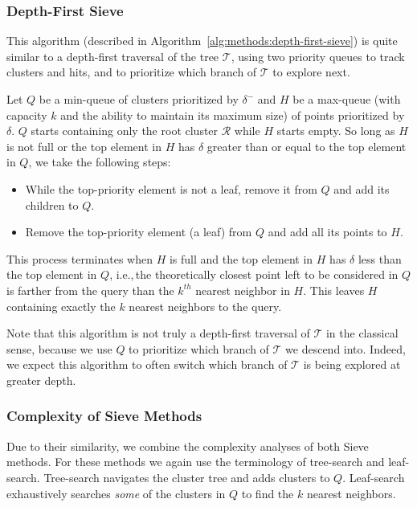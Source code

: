 \subsubsection{Depth-First Sieve}
\label{sec:methods:knn-search:depth-first-sieve}

This algorithm (described in Algorithm~\ref{alg:methods:depth-first-sieve}) is quite similar to a depth-first traversal of the tree $\mathcal{T}$, using two priority queues to track clusters and hits, and to prioritize which branch of $\mathcal{T}$ to explore next.

Let $Q$ be a min-queue of clusters prioritized by $\delta^{-}$ and $H$ be a max-queue (with capacity $k$ and the ability to maintain its maximum size) of points prioritized by $\delta$.
$Q$ starts containing only the root cluster $\mathcal{R}$ while $H$ starts empty.
So long as $H$ is not full or the top element in $H$ has $\delta$ greater than or equal to the top element in $Q$, we take the following steps:

\begin{itemize}
    \item While the top-priority element is not a leaf, remove it from $Q$ and add its children to $Q$.
    \item Remove the top-priority element (a leaf) from $Q$ and add all its points to $H$.
\end{itemize}

This process terminates when $H$ is full and the top element in $H$ has $\delta$ less than the top element in $Q$, i.e.,\,the theoretically closest point left to be considered in $Q$ is farther from the query than the $k^{th}$ nearest neighbor in $H$.
This leaves $H$ containing exactly the $k$ nearest neighbors to the query.

Note that this algorithm is not truly a depth-first traversal of $\mathcal{T}$ in the classical sense, because we use $Q$ to prioritize which branch of $\mathcal{T}$ we descend into.
Indeed, we expect this algorithm to often switch which branch of $\mathcal{T}$ is being explored at greater depth.


\subsubsection{Complexity of Sieve Methods}
\label{sec:methods:knn-search:complexity-of-sieve-methods}

Due to their similarity, we combine the complexity analyses of both Sieve methods.
For these methods we again use the terminology of tree-search and leaf-search.
Tree-search navigates the cluster tree and adds clusters to $Q$.
Leaf-search exhaustively searches \textit{some} of the clusters in $Q$ to find the $k$ nearest neighbors.


